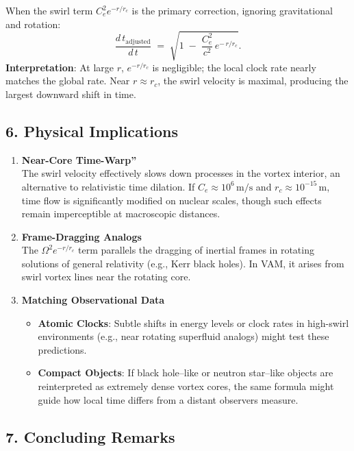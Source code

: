 When the swirl term \(C_e^2 e^{-r/r_c}\) is the primary correction, ignoring gravitational and rotation:
\[
    \frac{d\,t_\text{adjusted}}{d\,t}
    \;=\;
    \sqrt{
        1
        \;-\;
        \frac{C_e^2}{c^2}\, e^{-\,r/r_c}
    }.
\]
\textbf{Interpretation}: At large \(r\), \(e^{-r/r_c}\) is negligible; the local clock rate nearly matches the global rate. Near \(r\approx r_c\), the swirl velocity is maximal, producing the largest downward shift in time.

\subsection*{6. Physical Implications}

\begin{enumerate}
    \item \textbf{Near-Core \grqq Time-Warp\textquotedblright} \\
    The swirl velocity effectively slows down processes in the vortex interior, an alternative to relativistic time dilation. If \(C_e\approx 10^6\,\text{m/s}\) and \(r_c\approx 10^{-15}\,\text{m}\), time flow is significantly modified on nuclear scales, though such effects remain imperceptible at macroscopic distances.
    \item \textbf{Frame-Dragging Analogs} \\
    The \(\Omega^2 e^{-r/r_c}\) term parallels the dragging of inertial frames in rotating solutions of general relativity (e.g., Kerr black holes). In VAM, it arises from swirl vortex lines near the rotating core.
    \item \textbf{Matching Observational Data} \\
    \begin{itemize}
        \item \textbf{Atomic Clocks}: Subtle shifts in energy levels or clock rates in high-swirl environments (e.g., near rotating superfluid analogs) might test these predictions.
        \item \textbf{Compact Objects}: If black hole–like or neutron star–like objects are reinterpreted as extremely dense vortex cores, the same formula might guide how local time differs from a distant observer\rqs s measure.
    \end{itemize}
\end{enumerate}

\subsection*{7. Concluding Remarks}

